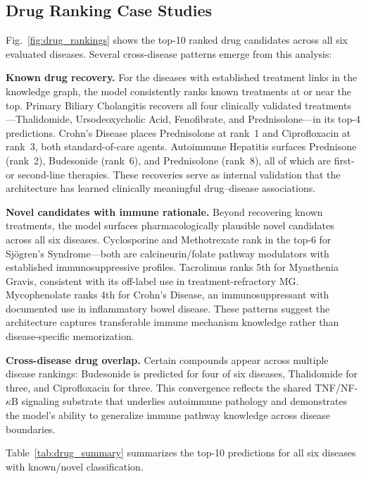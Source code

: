 \documentclass[conference]{IEEEtran}
\begin{document}
\subsection{Drug Ranking Case Studies}

Fig.~\ref{fig:drug_rankings} shows the top-10 ranked drug candidates across all six evaluated diseases. Several cross-disease patterns emerge from this analysis:

\textbf{Known drug recovery.} For the diseases with established treatment links in the knowledge graph, the model consistently ranks known treatments at or near the top. Primary Biliary Cholangitis recovers all four clinically validated treatments---Thalidomide, Ursodeoxycholic Acid, Fenofibrate, and Prednisolone---in its top-4 predictions. Crohn's Disease places Prednisolone at rank~1 and Ciprofloxacin at rank~3, both standard-of-care agents. Autoimmune Hepatitis surfaces Prednisone (rank~2), Budesonide (rank~6), and Prednisolone (rank~8), all of which are first- or second-line therapies. These recoveries serve as internal validation that the architecture has learned clinically meaningful drug--disease associations.

\textbf{Novel candidates with immune rationale.} Beyond recovering known treatments, the model surfaces pharmacologically plausible novel candidates across all six diseases. Cyclosporine and Methotrexate rank in the top-6 for Sj\"{o}gren's Syndrome---both are calcineurin/folate pathway modulators with established immunosuppressive profiles. Tacrolimus ranks 5th for Myasthenia Gravis, consistent with its off-label use in treatment-refractory MG. Mycophenolate ranks 4th for Crohn's Disease, an immunosuppressant with documented use in inflammatory bowel disease. These patterns suggest the architecture captures transferable immune mechanism knowledge rather than disease-specific memorization.

\textbf{Cross-disease drug overlap.} Certain compounds appear across multiple disease rankings: Budesonide is predicted for four of six diseases, Thalidomide for three, and Ciprofloxacin for three. This convergence reflects the shared TNF/NF-$\kappa$B signaling substrate that underlies autoimmune pathology and demonstrates the model's ability to generalize immune pathway knowledge across disease boundaries.

Table~\ref{tab:drug_summary} summarizes the top-10 predictions for all six diseases with known/novel classification.
\end{document}
